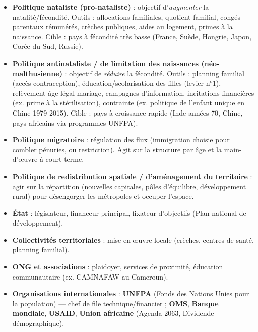 \documentclass[11pt]{article}
\begin{document}
\begin{definition}
\begin{itemize}
\item \textbf{Politique nataliste (pro-nataliste)} : objectif d'\emph{augmenter} la natalité/fécondité. Outils : allocations familiales, quotient familial, congés parentaux rémunérés, crèches publiques, aides au logement, primes à la naissance. Cible : pays à fécondité très basse (France, Suède, Hongrie, Japon, Corée du Sud, Russie).
\item \textbf{Politique antinataliste / de limitation des naissances (néo-malthusienne)} : objectif de \emph{réduire} la fécondité. Outils : planning familial (accès contraception), éducation/scolarisation des filles (levier n°1), relèvement âge légal mariage, campagnes d'information, incitations financières (ex. prime à la stérilisation), contrainte (ex. politique de l'enfant unique en Chine 1979-2015). Cible : pays à croissance rapide (Inde années 70, Chine, pays africains via programmes UNFPA).
\item \textbf{Politique migratoire} : régulation des flux (immigration choisie pour combler pénuries, ou restriction). Agit sur la structure par âge et la main-d'œuvre à court terme.
\item \textbf{Politique de redistribution spatiale / d'aménagement du territoire} : agir sur la répartition (nouvelles capitales, pôles d'équilibre, développement rural) pour désengorger les métropoles et occuper l'espace.
\end{itemize}
\end{definition}

\begin{propriete}
\begin{itemize}
\item \textbf{État} : législateur, financeur principal, fixateur d'objectifs (Plan national de développement).
\item \textbf{Collectivités territoriales} : mise en œuvre locale (crèches, centres de santé, planning familial).
\item \textbf{ONG et associations} : plaidoyer, services de proximité, éducation communautaire (ex. CAMNAFAW au Cameroun).
\item \textbf{Organisations internationales} : \textbf{UNFPA} (Fonds des Nations Unies pour la population) — chef de file technique/financier ; \textbf{OMS}, \textbf{Banque mondiale}, \textbf{USAID}, \textbf{Union africaine} (Agenda 2063, Dividende démographique).
\end{itemize}
\end{propriete}
\end{document}
